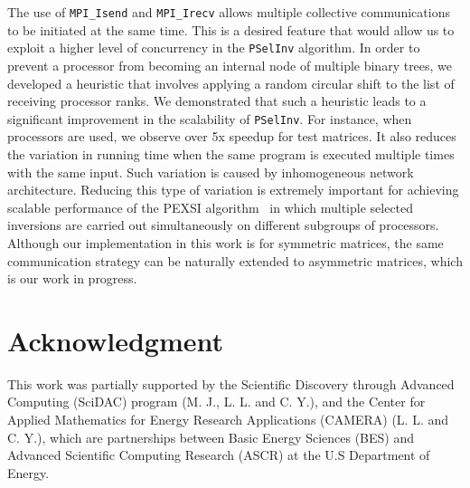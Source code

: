 \documentclass{acm_proc_article-sp}
\newcommand{\pselinv}{\texttt{PSelInv}\xspace}
\begin{document}
The use of \texttt{MPI\_Isend} and \texttt{MPI\_Irecv} 
allows multiple collective communications to be initiated
at the same time. This is a desired feature that would allow
us to exploit a higher level of concurrency in the \pselinv 
algorithm. In order to prevent a processor from becoming 
an internal node of multiple binary trees, we developed
a heuristic that involves applying a random circular shift to 
the list of receiving processor ranks. We demonstrated that such
a heuristic leads to a significant improvement in the scalability
of \pselinv. For instance, when  processors are used, we observe
over 5x speedup for test matrices. It also reduces the variation in running time when
the same program is executed multiple times with the same input.
Such variation is caused by inhomogeneous network architecture.
Reducing this type of variation is extremely important for 
achieving scalable performance of the PEXSI
algorithm~\cite{LinLuYingCarE2009,LinYangLuEtAl2011,LinChenYangEtAl2013}
in which multiple selected inversions are carried out simultaneously on
different subgroups of processors. Although our implementation in this
work is for symmetric matrices, the same communication strategy can
be naturally extended to asymmetric matrices, which is our work in
progress.












\section*{Acknowledgment}
This work was partially supported by the Scientific Discovery through
Advanced Computing (SciDAC) program (M. J., L. L.  and C. Y.), and the
Center for Applied Mathematics for Energy Research Applications (CAMERA)
(L. L. and C. Y.), which are partnerships between Basic
Energy Sciences (BES) and Advanced Scientific Computing Research (ASCR)
at the U.S Department of Energy.



\end{document}
